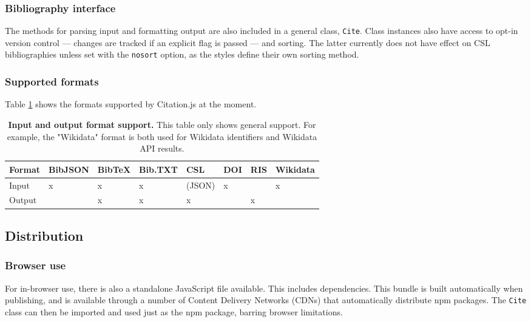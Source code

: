 \documentclass[fleqn,10pt,lineno]{wlpeerj} %
\begin{document}
\subsubsection*{Bibliography interface}

The methods for parsing input and formatting output are also included in a general class, \texttt{Cite}. Class instances also have access to opt-in version control --- changes are tracked if an explicit flag is passed --- and sorting. The latter currently does not have effect on CSL bibliographies unless set with the \texttt{nosort} option, as the styles define their own sorting method.

\subsubsection*{Supported formats}

Table \ref{table:support} shows the formats supported by Citation.js at the moment.

\begin{table}[bt!]
\caption{\textbf{Input and output format support.}
This table only shows general support. For example, the "Wikidata" format is both used for Wikidata identifiers and Wikidata API results.}
\label{table:support}
\begin{tabular}{|l|l|l|l|l|l|l|l|}
\hline
\textbf{Format} & \textbf{BibJSON} & \textbf{BibTeX} & \textbf{Bib.TXT} & \textbf{CSL} & \textbf{DOI} & \textbf{RIS} & \textbf{Wikidata} \\ \hline
Input           & x                & x               & x                & (JSON)       & x            &              & x                 \\ \hline
Output          & \textbf{}        & x               & x                & x            &              & x            &                   \\ \hline
\end{tabular}
\end{table}

\subsection*{Distribution}

\subsubsection*{Browser use}

For in-browser use, there is also a standalone JavaScript file available. This includes dependencies. This bundle is built automatically when publishing, and is available through a number of Content Delivery Networks (CDNs) that automatically distribute npm packages. The \texttt{Cite} class can then be imported and used just as the npm package, barring browser limitations.
\end{document}
